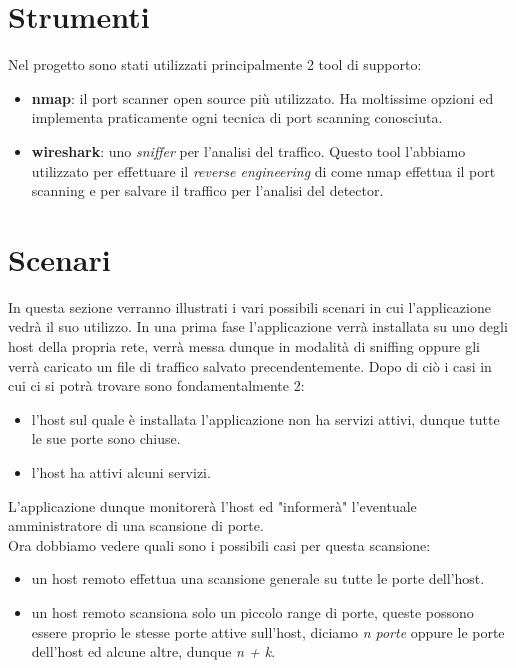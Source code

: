 \documentclass[a4paper,12pt]{article} %
\begin{document}
\section{Strumenti}

Nel progetto sono stati utilizzati principalmente 2 tool di supporto:

\begin{itemize}

\item \textbf{nmap}: il port scanner open source più utilizzato. Ha moltissime opzioni ed implementa praticamente 
ogni tecnica di port scanning conosciuta.

\item \textbf{wireshark}: uno \emph{sniffer} per l'analisi del traffico. Questo tool l'abbiamo utilizzato per effettuare
il \emph{reverse engineering} di come nmap effettua il port scanning e per salvare il traffico per l'analisi del detector.



\end{itemize}




\section{Scenari}

In questa sezione verranno illustrati i vari possibili scenari in cui l'applicazione vedrà il suo utilizzo. 
In una prima fase l'applicazione verrà installata su uno degli host della propria rete, verrà messa dunque in modalità di sniffing oppure
gli verrà caricato un file di traffico salvato precendentemente. 
Dopo di ciò i casi in cui ci si potrà trovare sono fondamentalmente 2:

\begin{itemize}

\item l'host sul quale è installata l'applicazione non ha servizi attivi, dunque tutte le sue porte sono chiuse.

\item l'host ha attivi alcuni servizi.

\end{itemize}


L'applicazione dunque monitorerà l'host ed "informerà" l'eventuale amministratore di una scansione di porte.\\
Ora dobbiamo vedere quali sono i possibili casi per questa scansione:


\begin{itemize}

\item un host remoto effettua una scansione generale su tutte le porte dell'host.

\item un host remoto scansiona solo un piccolo range di porte, queste possono essere proprio le stesse porte attive sull'host, diciamo 
\emph{n porte} oppure le porte dell'host ed alcune altre, dunque \emph{n + k}.

\end{itemize}
\end{document}
